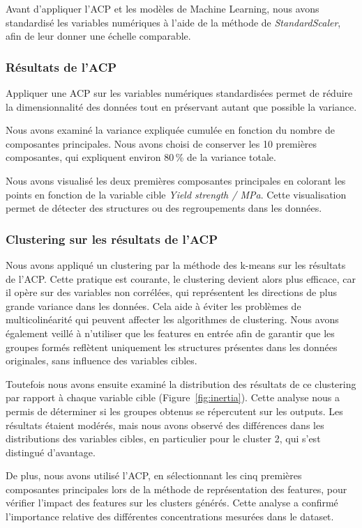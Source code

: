 \documentclass{article}
\begin{document}
Avant d'appliquer l'ACP et les modèles de Machine Learning, nous avons standardisé les variables numériques à l'aide de la méthode de \textit{StandardScaler}, afin de leur donner une échelle comparable.

\subsubsection{Résultats de l'ACP}

Appliquer une ACP sur les variables numériques standardisées permet de réduire la dimensionnalité des données tout en préservant autant que possible la variance.

Nous avons examiné la variance expliquée cumulée en fonction du nombre de composantes principales. Nous avons choisi de conserver les 10 premières composantes, qui expliquent environ 80\,\% de la variance totale.

Nous avons visualisé les deux premières composantes principales en colorant les points en fonction de la variable cible \textit{Yield strength / MPa}. Cette visualisation permet de détecter des structures ou des regroupements dans les données.

\subsubsection{Clustering sur les résultats de l'ACP}
Nous avons appliqué un clustering par la méthode des k-means sur les résultats de l'ACP. Cette pratique est courante, le clustering devient alors plus efficace, car il opère sur des variables non corrélées, qui représentent les directions de plus grande variance dans les données. Cela aide à éviter les problèmes de multicolinéarité qui peuvent affecter les algorithmes de clustering. Nous avons également veillé à n'utiliser que les features en entrée afin de garantir que les groupes formés reflètent uniquement les structures présentes dans les données originales, sans influence des variables cibles.

Toutefois nous avons ensuite examiné la distribution des résultats de ce clustering par rapport à chaque variable cible (Figure~\ref{fig:inertia}). Cette analyse nous a permis de déterminer si les groupes obtenus se répercutent sur les outputs. Les résultats étaient modérés, mais nous avons observé des différences dans les distributions des variables cibles, en particulier pour le cluster 2, qui s'est distingué d'avantage.

De plus, nous avons utilisé l'ACP, en sélectionnant les cinq premières composantes principales lors de la méthode de représentation des features, pour vérifier l'impact des features sur les clusters générés. Cette analyse a confirmé l'importance relative des différentes concentrations mesurées dans le dataset. 
\end{document}
